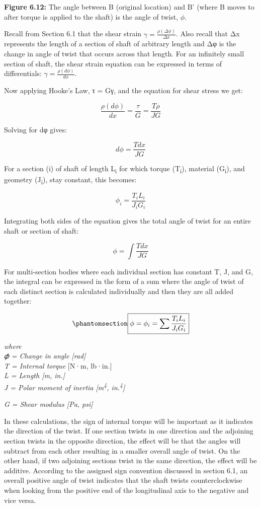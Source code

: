 \documentclass[
  letterpaper,
  DIV=11,
  numbers=noendperiod]{scrreprt}
\theoremstyle{definition}
\theoremstyle{remark}
\begin{document}
\textbf{Figure 6.12:} The angle between B (original location) and B'
(where B moves to after torque is applied to the shaft) is the angle of
twist, \(\phi\).

Recall from Section 6.1 that the shear strain
\(\gamma=\frac{\rho(\Delta \phi)}{\Delta x}\). Also recall that Δx
represents the length of a section of shaft of arbitrary length and Δφ
is the change in angle of twist that occurs across that length. For an
infinitely small section of shaft, the shear strain equation can be
expressed in terms of differentials:
\(\gamma=\frac{\rho(d \phi)}{d x}\).

Now applying Hooke's Law, τ = Gγ, and the equation for shear stress we
get:

\[
\frac{\rho(d \phi)}{d x}=\frac{\tau}{G}=\frac{T \rho}{J G}
\]

Solving for dφ gives:

\[
d \phi=\frac{T d x}{J G}
\]

For a section (i) of shaft of length L\textsubscript{i} for which torque
(T\textsubscript{i}), material (G\textsubscript{i}), and geometry
(J\textsubscript{i}), stay constant, this becomes:

\[
\phi_i=\frac{T_i L_i}{J_i G_i}
\]

Integrating both sides of the equation gives the total angle of twist
for an entire shaft or section of shaft:

\[
\phi=\int \frac{T d x}{J G}
\]

For multi-section bodies where each individual section has constant T,
J, and G, the integral can be expressed in the form of a sum where the
angle of twist of each distinct section is calculated individually and
then they are all added together:

\begin{equation}\phantomsection\label{eq-6.2}{
\boxed{\phi=\phi_i=\sum \frac{T_i L_i}{J_i G_i}}
}\end{equation}

\emph{where}\\
\emph{𝜙 = Change in angle {[}rad{]}}\\
\emph{T = Internal torque} {[}N·m, lb·in.{]}\\
\emph{L = Length {[}m, in.{]}}\\
\emph{J = Polar moment of inertia {[}m\textsuperscript{4},
in.\textsuperscript{4}{]}}

\emph{G = Shear modulus {[}Pa, psi{]}}

In these calculations, the sign of internal torque will be important as
it indicates the direction of the twist. If one section twists in one
direction and the adjoining section twists in the opposite direction,
the effect will be that the angles will subtract from each other
resulting in a smaller overall angle of twist. On the other hand, if two
adjoining sections twist in the same direction, the effect will be
additive. According to the assigned sign convention discussed in section
6.1, an overall positive angle of twist indicates that the shaft twists
counterclockwise when looking from the positive end of the longitudinal
axis to the negative and vice versa.
\end{document}
